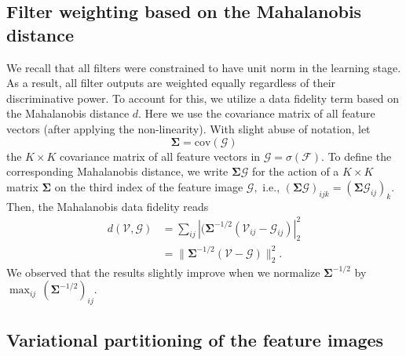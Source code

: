 \documentclass[journal]{IEEEtran}
\newcommand{\Matrix}[1]{\mathbf{#1}}
\newcommand{\Tensor}[1]{\mathcal{#1}}
\begin{document}
\subsection{Filter weighting based on the Mahalanobis distance}
\label{subsec:Mahalanb}

We recall that all filters were constrained to have unit norm in the learning stage.
As a result, all filter outputs are weighted equally regardless of their discriminative power.
To account for this, we utilize a data fidelity term based on the Mahalanobis distance $d$.
Here we use the covariance matrix of all feature vectors (after applying the non-linearity). With slight abuse of notation, let
\[
\Matrix{\Sigma} = \textrm{cov}(\Tensor{G}) 
\]
the $K\times K$ covariance matrix of all feature vectors in $\Tensor{G} = \sigma(\Tensor{F})$. 
To define the corresponding
Mahalanobis distance, 
we write $\Matrix{\Sigma}\Tensor{G}$ for the action of a $K\times K$ matrix  $\Matrix{\Sigma}$
on the third index of the feature image $\Tensor{G},$ 
i.e.,
$(\Matrix{\Sigma}\Tensor{G})_{ijk} = (\Matrix{\Sigma}\Tensor{G}_{ij})_k.$
Then, the Mahalanobis data fidelity reads
\begin{equation}\label{eq:pottsMahalanobis}
    \begin{split}
d(\Tensor{V}, \Tensor{G} ) 
     &=
\sum_{ij} | ({\Matrix
     {\Sigma}^{-1/2}} (\Tensor{V}_{ij} - \Tensor{G}_{ij})|^2_2 \\
     &= 
    \| {\Matrix
     {\Sigma}^{-1/2}} (\Tensor{V} - \Tensor{G})\|^2_2.  
     \end{split}
\end{equation}
We observed that the results slightly improve 
 when we normalize $\Matrix{\Sigma}^{-1/2}$ by $\max_{ij} \, (\Matrix{\Sigma}^{-1/2})_{ij}.$

\subsection{Variational partitioning of the feature images}
\label{ssec:plainPottsSegmentation}
\end{document}

